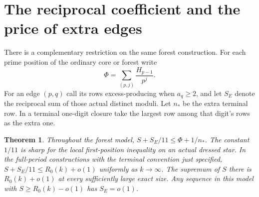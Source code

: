 \documentclass[11pt]{article}
\newtheorem{theorem}{Theorem}
\begin{document}
\section{The reciprocal coefficient and the price of extra edges}
There is a complementary restriction on the same forest construction. For each prime position of the ordinary core or forest write
\[
        \Phi=\sum_{(p,j)}\frac{H_{p-1}}{p^j}.
\]
For an edge $(p,q)$ call its rows excess-producing when $a_q\ge2$, and let $S_E$ denote the reciprocal sum of those actual distinct moduli. Let $n_*$ be the extra terminal row. In a terminal one-digit closure take the largest row among that digit's rows as the extra one.
\begin{theorem}\label{weight}
Throughout the forest model, $S+S_E/11\le\Phi+1/n_*$. The constant $1/11$ is sharp for the local first-position inequality on an actual dressed star. In the full-period constructions with the terminal convention just specified, $S+S_E/11\le R_0(k)+o(1)$ uniformly as $k\to\infty$. The supremum of $S$ there is $R_0(k)+o(1)$ at every sufficiently large exact size. Any sequence in this model with $S\ge R_0(k)-o(1)$ has $S_E=o(1)$.
\end{theorem}
\end{document}
